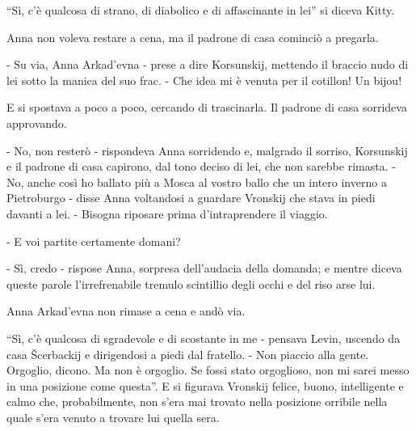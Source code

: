 ``Sì, c'è qualcosa di strano, di diabolico e di affascinante in lei'' si diceva Kitty. 

Anna non voleva restare a cena, ma il padrone di casa cominciò a pregarla. 

- Su via, Anna Arkad'evna - prese a dire Korsunskij, mettendo il braccio nudo di lei sotto la manica del suo frac. - Che idea mi è venuta per il cotillon! Un bijou! 

E si spostava a poco a poco, cercando di trascinarla. Il padrone di casa sorrideva approvando. 

- No, non resterò - rispondeva Anna sorridendo e, malgrado il sorriso, Korsunskij e il padrone di casa capirono, dal tono deciso di lei, che non sarebbe rimasta. - No, anche così ho ballato più a Mosca al vostro ballo che un intero inverno a Pietroburgo - disse Anna voltandosi a guardare Vronskij che stava in piedi davanti a lei. - Bisogna riposare prima d'intraprendere il viaggio. 

- E voi partite certamente domani? 

- Sì, credo - rispose Anna, sorpresa dell'audacia della domanda; e mentre diceva queste parole l'irrefrenabile tremulo scintillio degli occhi e del riso arse lui. 

Anna Arkad'evna non rimase a cena e andò via. 

\label{xxiv} 

``Sì, c'è qualcosa di sgradevole e di scostante in me - pensava Levin, uscendo da casa Šcerbackij e dirigendosi a piedi dal fratello. - Non piaccio alla gente. Orgoglio, dicono. Ma non è orgoglio. Se fossi stato orgoglioso, non mi sarei messo in una posizione come questa''. E si figurava Vronskij felice, buono, intelligente e calmo che, probabilmente, non s'era mai trovato nella posizione orribile nella quale s'era venuto a trovare lui quella sera. 


